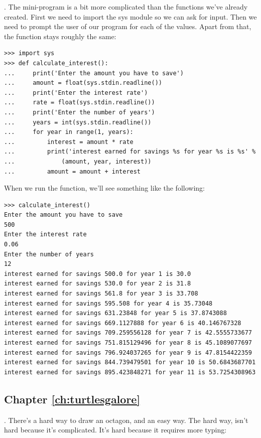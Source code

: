 . The mini-program is a bit more complicated than the functions we've already created.  First we need to import the sys module so we can ask for input.  Then we need to prompt the user of our program for each of the values.  Apart from that, the function stays roughly the same:

\begin{listing}
\begin{verbatim}
>>> import sys
>>> def calculate_interest():
...     print('Enter the amount you have to save')
...     amount = float(sys.stdin.readline())
...     print('Enter the interest rate')
...     rate = float(sys.stdin.readline())
...     print('Enter the number of years')
...     years = int(sys.stdin.readline())
...     for year in range(1, years):
...         interest = amount * rate
...         print('interest earned for savings %s for year %s is %s' % 
...             (amount, year, interest))
...         amount = amount + interest
\end{verbatim}
\end{listing}

\noindent
When we run the function, we'll see something like the following:

\begin{listingignore}
\begin{verbatim}
>>> calculate_interest()
Enter the amount you have to save
500
Enter the interest rate
0.06
Enter the number of years
12
interest earned for savings 500.0 for year 1 is 30.0
interest earned for savings 530.0 for year 2 is 31.8
interest earned for savings 561.8 for year 3 is 33.708
interest earned for savings 595.508 for year 4 is 35.73048
interest earned for savings 631.23848 for year 5 is 37.8743088
interest earned for savings 669.1127888 for year 6 is 40.146767328
interest earned for savings 709.259556128 for year 7 is 42.5555733677
interest earned for savings 751.815129496 for year 8 is 45.1089077697
interest earned for savings 796.924037265 for year 9 is 47.8154422359
interest earned for savings 844.739479501 for year 10 is 50.6843687701
interest earned for savings 895.423848271 for year 11 is 53.7254308963
\end{verbatim}
\end{listingignore}

\subsection*{Chapter \ref{ch:turtlesgalore}}

. There's a hard way to draw an octagon, and an easy way.  The hard way, isn't hard because it's complicated.  It's hard because it requires more typing:

